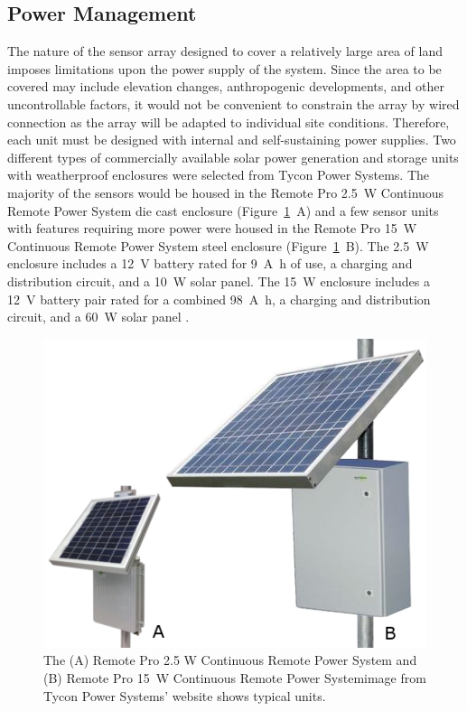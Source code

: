 \documentclass[numbook, envcountsect, envcountsame, envcountreset, runningheads, twocolumn]{svjour3}
\begin{document}
		
		\subsection{Power Management}
		
			The nature of the sensor array designed to cover a relatively large area of land imposes limitations upon the power supply of the system.  Since the area to be covered may include elevation changes, anthropogenic developments, and other uncontrollable factors, it would not be convenient to constrain the array by wired connection as the array will be adapted to individual site conditions.  Therefore, each unit must be designed with internal and self-sustaining power supplies.  Two different types of commercially available solar power generation and storage units with weatherproof enclosures were selected from Tycon Power Systems.  The majority of the sensors would be housed in the Remote Pro \SI{2.5}{\watt} Continuous Remote Power System die cast enclosure (Figure~\ref{fig:enclosure}~A) and a few sensor units with features requiring more power were housed in the Remote Pro \SI{15}{\watt} Continuous Remote Power System steel enclosure (Figure~\ref{fig:enclosure}~B).  The \SI{2.5}{\watt} enclosure includes a \SI{12}{\volt} battery rated for \SI{9}{\ampere\hour} of use, a charging and distribution circuit, and a \SI{10}{\watt} solar panel.  The \SI{15}{\watt} enclosure includes a \SI{12}{\volt} battery pair rated for a combined \SI{98}{\ampere\hour}, a charging and distribution circuit, and a \SI{60}{\watt} solar panel \cite{tycon_power_systems_remotepro_2014}.  
			
			\begin{figure}[!t]
				\centering
				\includegraphics[width=\columnwidth,height=0.8\columnwidth,keepaspectratio]{enclosures.png}
				\caption[Tycon Power Systems enclosures]{The (A) Remote Pro 2.5 W Continuous Remote Power System and (B) Remote Pro \SI{15}{\watt} Continuous Remote Power System\textendash{}image from Tycon Power Systems' website shows typical units.}
				\label{fig:enclosure}
			\end{figure}
			
\end{document}
